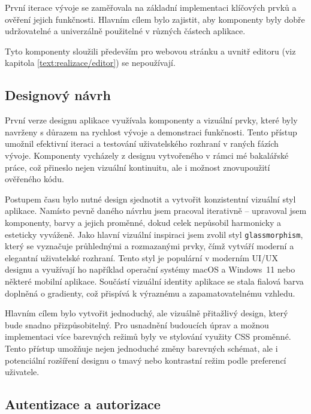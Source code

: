 První iterace vývoje se zaměřovala na základní implementaci klíčových prvků a ověření jejich funkčnosti. 
Hlavním cílem bylo zajistit, aby komponenty byly dobře udržovatelné a univerzálně použitelné v různých částech aplikace.

Tyto komponenty sloužili především pro webovou stránku a uvnitř editoru (viz kapitola \ref{text:realizace/editor}) se nepoužívají.


\subsection{Designový návrh}

První verze designu aplikace využívala komponenty a vizuální prvky, které byly navrženy s důrazem na rychlost vývoje a demonstraci funkčnosti. 
Tento přístup umožnil efektivní iteraci a testování uživatelského rozhraní v raných fázích vývoje.
Komponenty vycházely z designu vytvořeného v rámci mé bakalářské práce, což přineslo nejen vizuální kontinuitu, ale i možnost znovupoužití ověřeného kódu.

Postupem času bylo nutné design sjednotit a vytvořit konzistentní vizuální styl aplikace.
Namísto pevně daného návrhu jsem pracoval iterativně -- upravoval jsem komponenty, barvy a jejich proměnné, dokud celek nepůsobil harmonicky a esteticky vyváženě. 
Jako hlavní vizuální inspiraci jsem zvolil styl \texttt{glassmorphism}, který se vyznačuje průhlednými a rozmazanými prvky, čímž vytváří moderní a elegantní uživatelské rozhraní.
Tento styl je populární v moderním UI/UX designu a využívají ho například operační systémy macOS a Windows~11 nebo některé mobilní aplikace.
Součástí vizuální identity aplikace se stala fialová barva doplněná o gradienty, což přispívá k výraznému a zapamatovatelnému vzhledu.

Hlavním cílem bylo vytvořit jednoduchý, ale vizuálně přitažlivý design, který bude snadno přizpůsobitelný. 
Pro usnadnění budoucích úprav a možnou implementaci více barevných režimů byly ve stylování využity CSS proměnné.
Tento přístup umožňuje nejen jednoduché změny barevných schémat, ale i potenciální rozšíření designu o tmavý nebo kontrastní režim podle preferencí uživatele.

\subsection{Autentizace a autorizace}

